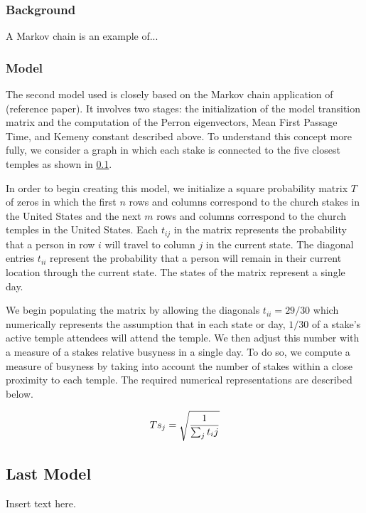 \documentclass[twoside,twocolumn]{article}
\begin{document}
\subsubsection{Background}

A Markov chain is an example of...

\subsubsection{Model}
The second model used is closely based on the Markov chain application of (reference paper). It involves two stages: the initialization of the model transition matrix and the computation of the Perron eigenvectors, Mean First Passage Time, and Kemeny constant described above. To understand this concept more fully, we consider a graph in which each stake is connected to the five closest temples as shown in \ref{}.

In order to begin creating this model, we initialize a square probability matrix $T$ of zeros in which the first $n$ rows and columns correspond to the church stakes in the United States and the next $m$ rows and columns correspond to the church temples in the United States. Each $t_{ij}$ in the matrix represents the probability that a person in row $i$ will travel to column $j$ in the current state. The diagonal entries $t_{ii}$ represent the probability that a person will remain in their current location through the current state. The states of the matrix represent a single day.

We begin populating the matrix by allowing the diagonals $t_{ii} = 29/30$ which numerically represents the assumption that in each state or day, $1/30$ of a stake's active temple attendees will attend the temple. We then adjust this number with a measure of a stakes relative busyness in a single day. To do so, we compute a measure of busyness by taking into account the number of stakes within a close proximity to each temple. The required numerical representations are described below.

\begin{equation}
\begin{aligned}
Ts_j = \sqrt{1\over{\sum_j{t_ij}}}
\end{aligned}
\end{equation}


\subsection{Last Model} %
Insert text here.
\end{document}
